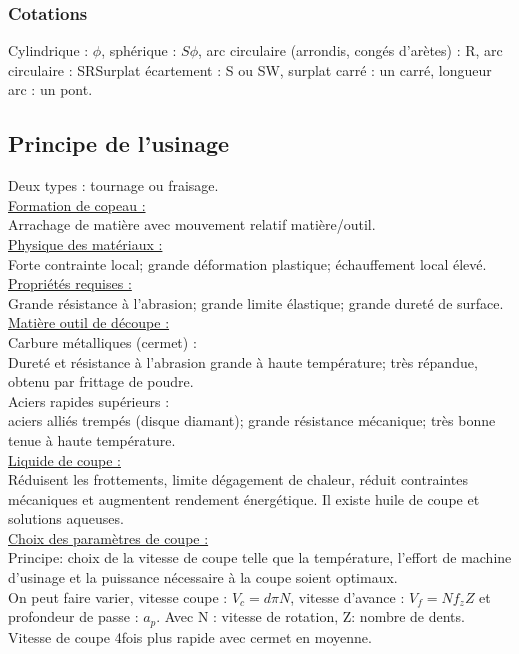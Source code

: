 \documentclass[../main.tex]{subfiles}
\begin{document}
\subsubsection{Cotations}
Cylindrique : $\phi$, sphérique : $S\phi$, arc circulaire (arrondis, congés d'arètes) : R, arc circulaire : SRSurplat écartement : S ou SW, surplat carré : un carré, longueur arc : un pont.

\subsection{Principe de l'usinage}
Deux types : tournage ou fraisage. \\

\quad \underline{Formation de copeau :}\\
Arrachage de matière avec mouvement relatif matière/outil.\\

\quad \underline{Physique des matériaux :}\\
Forte contrainte local; grande déformation plastique; échauffement local élevé.\\

\quad \underline{Propriétés requises :}\\
Grande résistance à l'abrasion; grande limite élastique; grande dureté de surface.\\

\quad \underline{Matière outil de découpe :}\\
Carbure métalliques (cermet) :\\
Dureté et résistance à l'abrasion grande à haute température; très répandue, obtenu par frittage de poudre.\\
Aciers rapides supérieurs :\\
aciers alliés trempés (disque diamant); grande résistance mécanique; très bonne tenue à haute température. \\

\quad \underline{Liquide de coupe :}\\
Réduisent les frottements, limite dégagement de chaleur, réduit contraintes mécaniques et augmentent rendement énergétique. Il existe huile de coupe et solutions aqueuses. \\

\quad \underline{Choix des paramètres de coupe :}\\
Principe: choix de la vitesse de coupe telle que la température, l'effort de machine d'usinage et la puissance nécessaire à la coupe soient optimaux. \\
On peut faire varier, vitesse coupe : $V_c = d\pi N$, vitesse d'avance : $V_f = N f_z Z$ et profondeur de passe : $a_p$. \color{gray} Avec N : vitesse de rotation, Z: nombre de dents. Vitesse de coupe 4fois plus rapide avec cermet en moyenne.\color{black}\\
\end{document}
